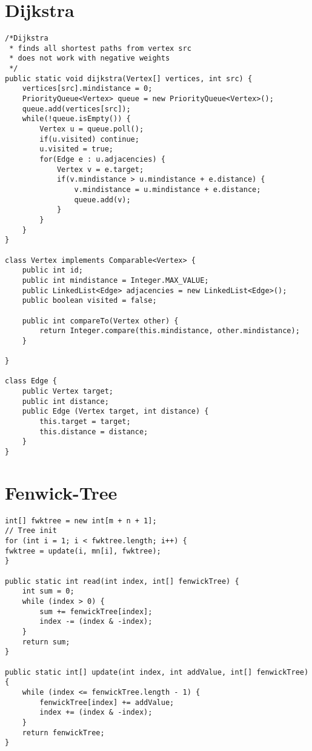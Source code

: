 \documentclass[10pt,a4paper]{article}
\begin{document}
\section{Dijkstra}
\begin{lstlisting}
/*Dijkstra
 * finds all shortest paths from vertex src
 * does not work with negative weights
 */
public static void dijkstra(Vertex[] vertices, int src) {
    vertices[src].mindistance = 0;
    PriorityQueue<Vertex> queue = new PriorityQueue<Vertex>();
    queue.add(vertices[src]);
    while(!queue.isEmpty()) {
        Vertex u = queue.poll();
        if(u.visited) continue;
        u.visited = true;
        for(Edge e : u.adjacencies) {
            Vertex v = e.target;
            if(v.mindistance > u.mindistance + e.distance) {
                v.mindistance = u.mindistance + e.distance;
                queue.add(v);
            }
        }
    }
}

class Vertex implements Comparable<Vertex> {
    public int id;
    public int mindistance = Integer.MAX_VALUE;
    public LinkedList<Edge> adjacencies = new LinkedList<Edge>();
    public boolean visited = false;

    public int compareTo(Vertex other) {
        return Integer.compare(this.mindistance, other.mindistance);
    }

}

class Edge {  
    public Vertex target;
    public int distance;
    public Edge (Vertex target, int distance) {
        this.target = target;
        this.distance = distance;
    }
}
\end{lstlisting}
\section{Fenwick-Tree}
\begin{lstlisting}
int[] fwktree = new int[m + n + 1];
// Tree init
for (int i = 1; i < fwktree.length; i++) {
fwktree = update(i, mn[i], fwktree);
}

public static int read(int index, int[] fenwickTree) {
	int sum = 0;
	while (index > 0) {
		sum += fenwickTree[index];
		index -= (index & -index);
	}
	return sum;
}

public static int[] update(int index, int addValue, int[] fenwickTree) {
	while (index <= fenwickTree.length - 1) {
		fenwickTree[index] += addValue;
		index += (index & -index);
	}
	return fenwickTree;
}
\end{lstlisting}
\end{document}
